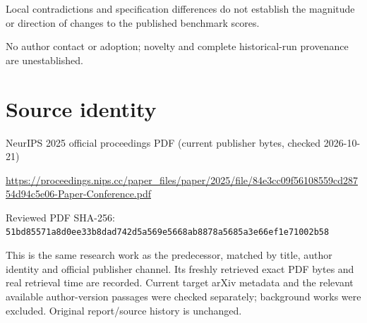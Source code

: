 \documentclass[11pt]{article}
\begin{document}
Local contradictions and specification differences do not establish the magnitude or direction of changes to the published benchmark scores.\par

No author contact or adoption; novelty and complete historical-run provenance are unestablished.\par

\section*{Source identity}

NeurIPS 2025 official proceedings PDF (current publisher bytes, checked 2026-10-21)

\url{https://proceedings.nips.cc/paper_files/paper/2025/file/84e3cc09f56108559cd28754d94c5e06-Paper-Conference.pdf}

Reviewed PDF SHA-256: \nolinkurl{51bd85571a8d0ee33b8dad742d5a569e5668ab8878a5685a3e66ef1e71002b58}

This is the same research work as the predecessor, matched by title, author identity and official publisher channel. Its freshly retrieved exact PDF bytes and real retrieval time are recorded. Current target arXiv metadata and the relevant available author-version passages were checked separately; background works were excluded. Original report/source history is unchanged.
\end{document}
